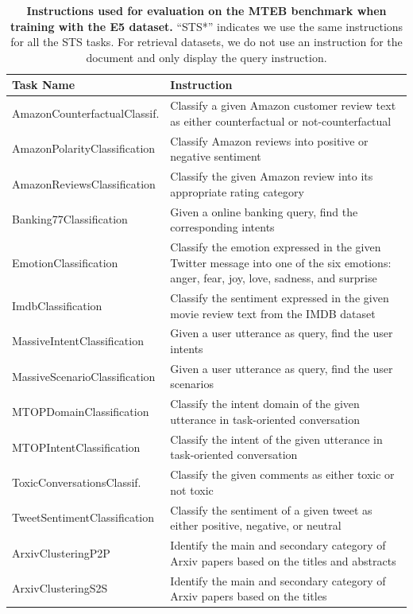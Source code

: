 \documentclass{article}
\begin{document}
\setlength\extrarowheight{5pt}
\begin{longtable}{lp{9cm}}
\caption{\textbf{Instructions used for evaluation on the MTEB benchmark when training with the E5 dataset.} ``STS*'' indicates we use the same instructions for all the STS tasks. For retrieval datasets, we do not use an instruction for the document and only display the query instruction.} \\
\toprule
Task Name & Instruction \\
\midrule
AmazonCounterfactualClassif. & Classify a given Amazon customer review text as either counterfactual or not-counterfactual \\
AmazonPolarityClassification & Classify Amazon reviews into positive or negative sentiment \\
AmazonReviewsClassification & Classify the given Amazon review into its appropriate rating category \\
Banking77Classification & Given a online banking query, find the corresponding intents \\
EmotionClassification & Classify the emotion expressed in the given Twitter message into one of the six emotions: anger, fear, joy, love, sadness, and surprise \\
ImdbClassification & Classify the sentiment expressed in the given movie review text from the IMDB dataset \\
MassiveIntentClassification & Given a user utterance as query, find the user intents \\
MassiveScenarioClassification & Given a user utterance as query, find the user scenarios \\
MTOPDomainClassification & Classify the intent domain of the given utterance in task-oriented conversation \\
MTOPIntentClassification & Classify the intent of the given utterance in task-oriented conversation \\
ToxicConversationsClassif. & Classify the given comments as either toxic or not toxic \\
TweetSentimentClassification & Classify the sentiment of a given tweet as either positive, negative, or neutral \\
\midrule
ArxivClusteringP2P & Identify the main and secondary category of Arxiv papers based on the titles and abstracts \\
ArxivClusteringS2S & Identify the main and secondary category of Arxiv papers based on the titles \\

\end{longtable}
\end{document}
